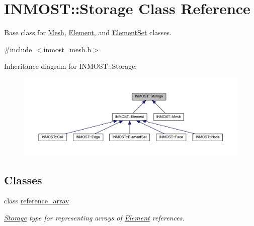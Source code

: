 \hypertarget{classINMOST_1_1Storage}{\section{I\-N\-M\-O\-S\-T\-:\-:Storage Class Reference}
\label{classINMOST_1_1Storage}
}


Base class for \hyperlink{classINMOST_1_1Mesh}{Mesh}, \hyperlink{classINMOST_1_1Element}{Element}, and \hyperlink{classINMOST_1_1ElementSet}{Element\-Set} classes.  




{\ttfamily \#include $<$inmost\-\_\-mesh.\-h$>$}



Inheritance diagram for I\-N\-M\-O\-S\-T\-:\-:Storage\-:\nopagebreak
\begin{figure}[H]
\begin{center}
\leavevmode
\includegraphics[width=350pt]{classINMOST_1_1Storage__inherit__graph}
\end{center}
\end{figure}
\subsection*{Classes}
\begin{DoxyCompactItemize}
\item 
class \hyperlink{classINMOST_1_1Storage_1_1reference__array}{reference\-\_\-array}
\begin{DoxyCompactList}\small\item\em \hyperlink{classINMOST_1_1Storage}{Storage} type for representing arrays of \hyperlink{classINMOST_1_1Element}{Element} references. \end{DoxyCompactList}\end{DoxyCompactItemize}
